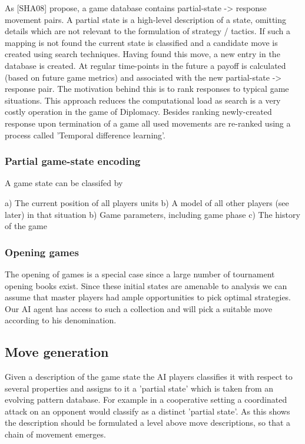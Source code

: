 \documentclass[12pt]{article}
\begin{document}
As [SHA08] propose, a game database contains partial-state -> response movement
pairs. A partial state is a high-level description of a state, omitting
details which are not relevant to the formulation of strategy / tactics. If
such a mapping is not found the current state is classified and a candidate move
is created using search techniques. Having found this move, a new entry in the 
database is created. At regular time-points in the future a payoff is calculated
(based on future game metrics) and associated with the new partial-state -> response pair.
The motivation behind this is to rank responses to typical game situations. This
approach reduces the computational load as search is a very costly operation in the
game of Diplomacy. Besides ranking newly-created response upon termination of a game
all used movements are re-ranked using a process called 'Temporal difference learning'.

\subsubsection{Partial game-state encoding}

A game state can be classifed by

a) The current position of all players units
b) A model of all other players (see later) in that situation 
b) Game parameters, including game phase
c) The history of the game


\subsubsection{Opening games}

The opening of games is a special case since a large number
of tournament opening books exist. Since these initial states are amenable to
analysis we can assume that master players had ample opportunities to
pick optimal strategies. Our AI agent has access to such a collection
and will pick a suitable move according to his denomination.

\subsection{Move generation}

Given a description of the game state the AI players classifies
it with respect to several properties and assigns to it a 'partial state'
which is taken from an evolving pattern database. For example in a cooperative
setting a coordinated attack on an opponent would classify as a distinct
'partial state'. As this shows the description should be formulated a level
above move descriptions, so that a chain of movement emerges.
\end{document}
